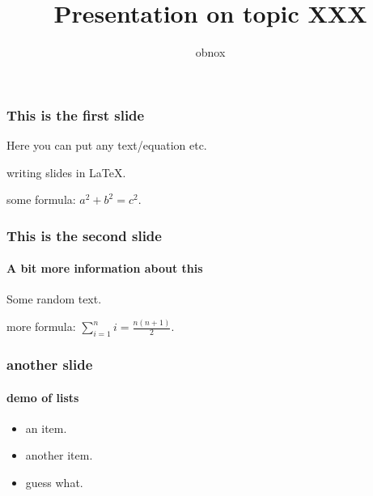 \documentclass[10pt]{beamer}
\title{Presentation on  topic XXX}
\author{obnox}
\begin{document}
    \maketitle
    \begin{frame}
	    \frametitle{This is the first slide}
		Here you can put any text/equation etc. 

        writing slides in \LaTeX.

        some formula: $a^2 + b^2 = c^2$.


    \end{frame}
	\begin{frame}
		\frametitle{This is the second slide}
		\framesubtitle{A bit more information about this}
		Some random text.		

        more formula: $\sum_{i=1}^{n}i = \frac{n(n+1)}{2}$.

    \end{frame}
    \begin{frame}
        \frametitle{another slide}
        \framesubtitle{demo of lists}
        \begin{itemize}
          \item an item.
          \item another item.
          \item guess what.
        \end{itemize}
    \end{frame}
\end{document}
